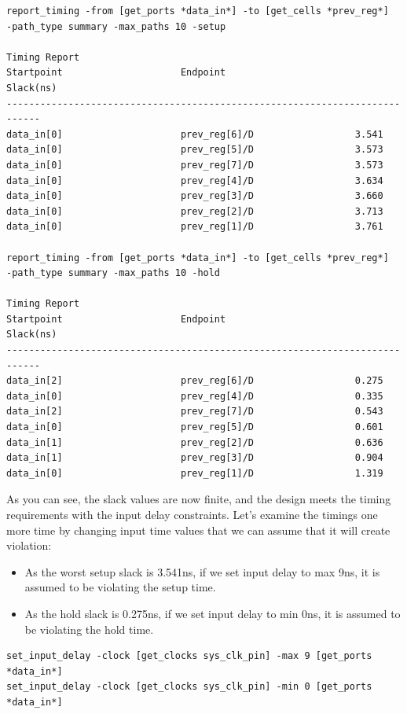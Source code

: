 \documentclass{report}
\begin{document}
\begin{verbatim}
report_timing -from [get_ports *data_in*] -to [get_cells *prev_reg*] 
-path_type summary -max_paths 10 -setup

Timing Report
Startpoint                     Endpoint                       Slack(ns)     
----------------------------------------------------------------------------
data_in[0]                     prev_reg[6]/D                  3.541         
data_in[0]                     prev_reg[5]/D                  3.573         
data_in[0]                     prev_reg[7]/D                  3.573         
data_in[0]                     prev_reg[4]/D                  3.634         
data_in[0]                     prev_reg[3]/D                  3.660         
data_in[0]                     prev_reg[2]/D                  3.713         
data_in[0]                     prev_reg[1]/D                  3.761 

report_timing -from [get_ports *data_in*] -to [get_cells *prev_reg*] 
-path_type summary -max_paths 10 -hold

Timing Report
Startpoint                     Endpoint                       Slack(ns)     
----------------------------------------------------------------------------
data_in[2]                     prev_reg[6]/D                  0.275         
data_in[0]                     prev_reg[4]/D                  0.335         
data_in[2]                     prev_reg[7]/D                  0.543         
data_in[0]                     prev_reg[5]/D                  0.601         
data_in[1]                     prev_reg[2]/D                  0.636         
data_in[1]                     prev_reg[3]/D                  0.904         
data_in[0]                     prev_reg[1]/D                  1.319    
\end{verbatim}
As you can see, the slack values are now finite, and the design meets the timing requirements with the input delay constraints. Let's examine the timings one more time by changing input time values that we can assume that it will create violation:
\begin{itemize}
    \item As the worst setup slack is 3.541ns, if we set input delay to max 9ns, it is assumed to be violating the setup time.
    \item As the hold slack is 0.275ns, if we set input delay to min 0ns, it is assumed to be violating the hold time.
\end{itemize}
\begin{verbatim}
set_input_delay -clock [get_clocks sys_clk_pin] -max 9 [get_ports *data_in*]
set_input_delay -clock [get_clocks sys_clk_pin] -min 0 [get_ports *data_in*]
\end{verbatim}
\end{document}
